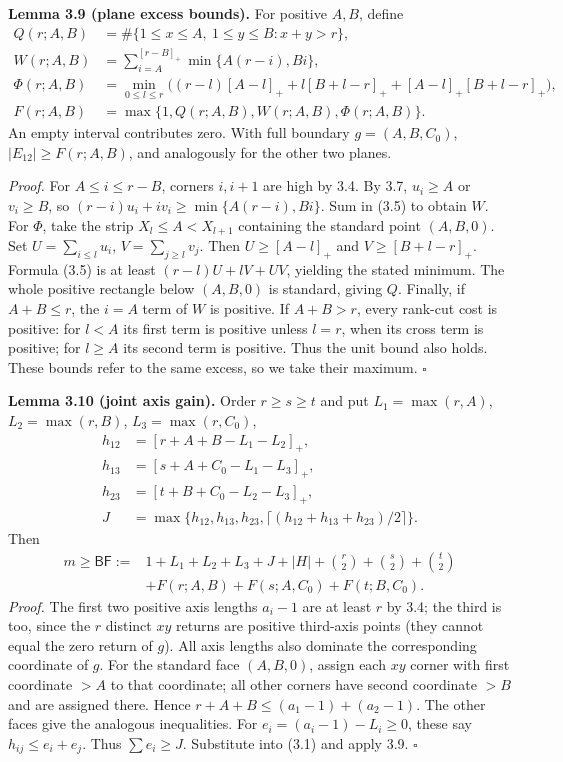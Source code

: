 \documentclass[11pt]{article}
\begin{document}
\label{res:A.8}
\textbf{Lemma 3.9 (plane excess bounds).}
For positive $A,B$, define
\[
\begin{split}
 Q(r;A,B)&=\#\{1\le x\le A,\ 1\le y\le B:x+y>r\},\\
 W(r;A,B)&=\sum_{i=A}^{[r-B]_+}\min\{A(r-i),Bi\},\\
 \Phi(r;A,B)&=\min_{0\le l\le r}\bigl((r-l)[A-l]_+
             +l[B+l-r]_++[A-l]_+[B+l-r]_+\bigr),\\
 F(r;A,B)&=\max\{1,Q(r;A,B),W(r;A,B),\Phi(r;A,B)\}.
\end{split}
\]
An empty interval contributes zero. With full boundary $g=(A,B,C_0)$,
$|E_{12}|\ge F(r;A,B)$, and analogously for the other two planes.

\emph{Proof.}
For $A\le i\le r-B$, corners $i,i+1$ are high by 3.4. By 3.7,
$u_i\ge A$ or $v_i\ge B$, so
$(r-i)u_i+iv_i\ge\min\{A(r-i),Bi\}$. Sum in (3.5) to obtain $W$.
For $\Phi$, take the strip $X_l\le A<X_{l+1}$ containing the standard
point $(A,B,0)$. Set $U=\sum_{i\le l}u_i$, $V=\sum_{j\ge l}v_j$.
Then $U\ge[A-l]_+$ and $V\ge[B+l-r]_+$. Formula (3.5) is at least
$(r-l)U+lV+UV$, yielding the stated minimum.
The whole positive rectangle below $(A,B,0)$ is standard, giving $Q$.
Finally, if $A+B\le r$, the $i=A$ term of $W$ is positive.
If $A+B>r$, every rank-cut cost is positive: for $l<A$ its first
term is positive unless $l=r$, when its cross term is positive;
for $l\ge A$ its second term is positive. Thus the unit bound also holds.
These bounds refer to the same excess, so we take their maximum.
\ensuremath{\square}

\label{res:A.9}
\textbf{Lemma 3.10 (joint axis gain).}
Order $r\ge s\ge t$ and put
$L_1=\max(r,A)$, $L_2=\max(r,B)$, $L_3=\max(r,C_0)$,
\[
\begin{split}
 h_{12}&=[r+A+B-L_1-L_2]_+,\\
 h_{13}&=[s+A+C_0-L_1-L_3]_+,\\
 h_{23}&=[t+B+C_0-L_2-L_3]_+,\\
 J&=\max\{h_{12},h_{13},h_{23},
               \lceil(h_{12}+h_{13}+h_{23})/2\rceil\}.
\end{split}
\]
Then
\[
\begin{split}
 m\ge\mathsf{BF}:={}&1+L_1+L_2+L_3+J+|H|
       +\binom r2+\binom s2+\binom t2\\
 &+F(r;A,B)+F(s;A,C_0)+F(t;B,C_0).
\end{split}\tag{3.6}
\]
\emph{Proof.}
The first two positive axis lengths $a_i-1$ are at least $r$ by 3.4;
the third is too, since the $r$ distinct $xy$ returns are positive
third-axis points (they cannot equal the zero return of $g$).
All axis lengths also dominate the corresponding coordinate of $g$.
For the standard face $(A,B,0)$, assign each $xy$ corner with first
coordinate $>A$ to that coordinate; all other corners have second
coordinate $>B$ and are assigned there. Hence
$r+A+B\le(a_1-1)+(a_2-1)$.
The other faces give the analogous inequalities. For
$e_i=(a_i-1)-L_i\ge0$, these say $h_{ij}\le e_i+e_j$.
Thus $\sum e_i\ge J$. Substitute into (3.1) and apply 3.9.
\ensuremath{\square}
\end{document}
